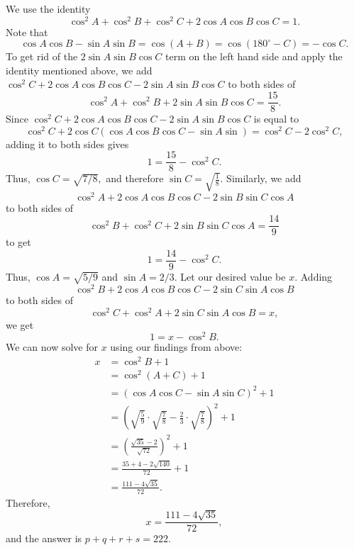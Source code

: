 \documentclass[11pt]{article}
\theoremstyle{definition}
\begin{document}
\begin{solution}[name={Solution by peelybonehead}]
	We use the identity $$\cos^2 A + \cos^2 B + \cos^2 C + 2\cos A\cos B\cos C = 1.$$ Note that$$\cos A\cos B -\sin A\sin B = \cos(A+B) = \cos(180^\circ-C) = -\cos C.$$To get rid of the $2 \sin A \sin B \cos C$ term on the left hand side and apply the identity mentioned above, we add $\cos^2 C+2\cos A\cos B\cos C - 2\sin A \sin B \cos C$ to both sides of $$\cos^2 A + \cos^2 B + 2 \sin A \sin B \cos C = \frac{15}{8}.$$ Since $\cos^2 C+2\cos A\cos B\cos C - 2\sin A \sin B \cos C$ is equal to $$\cos^2 C+2\cos C(\cos A\cos B\cos C - \sin A \sin ) = \cos^2 C -2\cos^2 C,$$ adding it to both sides gives$$1 = \frac{15}{8} - \cos^2 C.$$Thus, $\cos C = \sqrt{{7}/{8}},$ and therefore $\sin C=\sqrt{\frac{1}{8}}$. Similarly, we add $$\cos^2 A+2\cos A\cos B\cos C - 2\sin B \sin C \cos A$$ to both sides of $$\cos^2 B + \cos^2 C + 2 \sin B \sin C \cos A = \frac{14}{9}$$ to get $$1 = \frac{14}{9} - \cos^2 C.$$ Thus, $\cos A=\sqrt{{5}/{9}}$ and $\sin A={2}/{3}.$ Let our desired value be $x.$ Adding $$\cos^2 B+2\cos A\cos B\cos C - 2\sin C \sin A \cos B$$ to both sides of $$\cos^2 C + \cos^2 A + 2 \sin C \sin A \cos B = x,$$ we get $$1 = x - \cos^2 B.$$ We can now solve for $x$ using our findings from above:
	\begin{align*}
		x &= \cos^2 B + 1 \\
		&= \cos^2  (A +  C) + 1 \\
		&= (\cos A \cos C - \sin  A \sin C)^2 + 1\\
		&= \left(\sqrt{\frac{5}{9}}\cdot \sqrt{\frac{7}{8}} - \frac{2}{3}\cdot \sqrt{\frac{7}{8}} \right )^2 + 1\\
		&= \left ( \frac{\sqrt{35} - 2}{\sqrt{72}} \right )^2 + 1 \\
		&= \frac{35+4-2\sqrt{140}}{72}+1 \\
		&= \frac{111-4\sqrt{35}}{72}.
	\end{align*}Therefore, $$x=\frac{111-4\sqrt{35}}{72},$$ and the answer is $p+q+r+s = \boxed{222}.$
\end{solution}
\end{document}
